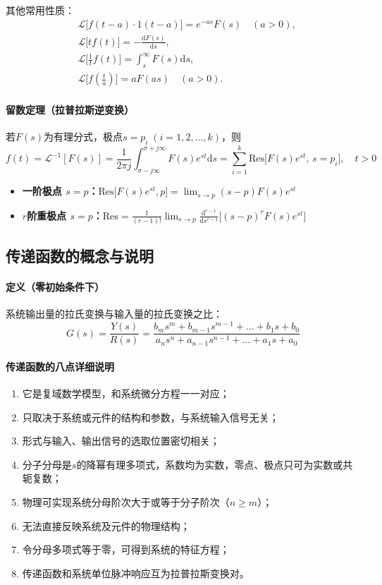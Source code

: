 其他常用性质：
\[
\begin{aligned}
&\mathcal{L}\big[f(t-a)\cdot 1(t-a)\big]=e^{-as}F(s)\quad(a>0),\\
&\mathcal{L}\big[t f(t)\big]=-\frac{\mathrm{d}F(s)}{\mathrm{d}s},\\
&\mathcal{L}\big[\tfrac1t f(t)\big]=\int_s^\infty F(s)\mathrm{d}s,\\
&\mathcal{L}\big[f(\tfrac ta)\big]=aF(as)\quad(a>0).
\end{aligned}
\]

\medskip

\paragraph{留数定理（拉普拉斯逆变换）}
若$F(s)$为有理分式，极点$s=p_i\;(i=1,2,\dots,k)$，则
\[
f(t)=\mathcal{L}^{-1}[F(s)]=\frac1{2\pi j}\int_{\sigma-j\infty}^{\sigma+j\infty}F(s)e^{st}\mathrm{d}s=\sum_{i=1}^k \mathrm{Res}\big[F(s)e^{st},\,s=p_i\big],\quad t>0
\]
\begin{itemize}
    \item \textbf{一阶极点 $s=p$：}$\displaystyle \mathrm{Res}\big[F(s)e^{st},p\big]=\lim_{s\to p}(s-p)F(s)e^{st}$
    \item \textbf{$r$阶重极点 $s=p$：}$\displaystyle \mathrm{Res}=\frac1{(r-1)!}\lim_{s\to p}\frac{\mathrm{d}^{r-1}}{\mathrm{d}s^{r-1}}\big[(s-p)^r F(s)e^{st}\big]$
\end{itemize}

\subsection{传递函数的概念与说明}
\paragraph{定义（零初始条件下）}
系统输出量的拉氏变换与输入量的拉氏变换之比：
\[
G(s) = \frac{Y(s)}{R(s)} = \frac{b_m s^m + b_{m-1} s^{m-1} + \dots + b_1 s + b_0}{a_n s^n + a_{n-1} s^{n-1} + \dots + a_1 s + a_0}
\]

\paragraph{传递函数的八点详细说明}
\begin{enumerate}
    \item 它是复域数学模型，和系统微分方程一一对应；
    \item 只取决于系统或元件的结构和参数，与系统输入信号无关；
    \item 形式与输入、输出信号的选取位置密切相关；
    \item 分子分母是$s$的降幂有理多项式，系数均为实数，零点、极点只可为实数或共轭复数；
    \item 物理可实现系统分母阶次大于或等于分子阶次（$n\ge m$）；
    \item 无法直接反映系统及元件的物理结构；
    \item 令分母多项式等于零，可得到系统的特征方程；
    \item 传递函数和系统单位脉冲响应互为拉普拉斯变换对。
\end{enumerate}

